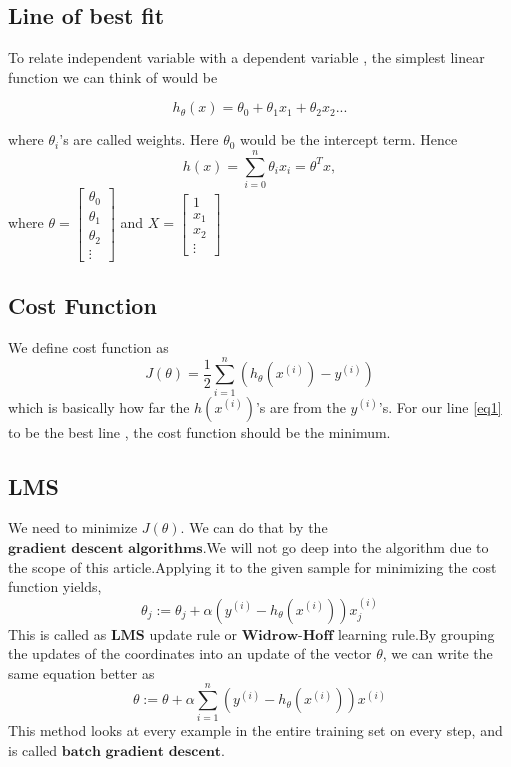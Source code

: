 \documentclass[a4paper,12pt,reqno]{amsart}
\begin{document}
\subsection{Line of best fit}
To relate independent variable with a dependent variable , the simplest linear function we can think of would be 

\begin{equation} \label{eq1}
h_{\theta}(x) = \theta_0 + \theta_{1}x_{1} + \theta_{2}x_{2} ...
\end{equation}

where $\theta_{i}$'s are called weights. Here $\theta_0$ would be the intercept term. Hence
\begin{equation} \label{eq2}
h(x) = \sum_{i=0}^{n} \theta_{i}x_{i} = \theta^{T}x,
\end{equation} 
where $\theta =  
\begin{bmatrix}
\theta_0 \\
\theta_1 \\
\theta_2 \\
\vdots
\end{bmatrix}
$
and 
$
X = 
\begin{bmatrix}
1 \\
x_1 \\
x_2 \\
\vdots
\end{bmatrix}
$
\subsection{Cost Function}
We define cost function as 
\begin{equation} \label{eq3}
J(\theta) = \frac{1}{2}\sum_{i=1}^{n}(h_{\theta}(x^{(i)}) - y^{(i)})
\end{equation}
which is basically how far the $h(x^{(i)})$'s are from the $y^{(i)}$'s.
For our line \ref{eq1} to be the best line , the cost function should be the minimum.
\subsection{LMS}
We need to minimize $J(\theta)$. We can do that by the $\textbf{gradient descent algorithms}$.We will not go deep into the algorithm due to the scope of this article.Applying it to the given sample for minimizing the cost function yields,
\begin{equation} \label{eq4}
\theta_{j} := \theta_{j} + \alpha(y^{(i)}-h_{\theta}(x^{(i)}))x_j^{(i)}
\end{equation}
This is called as $\textbf{LMS}$ update rule or $\textbf{Widrow-Hoff}$ learning rule.By grouping the updates of the coordinates into an update of the vector $\theta$, we can write the same equation better as 
\begin{equation} \label{eq5}
\theta := \theta + \alpha \sum_{i=1}^{n}(y^{(i)} - h_{\theta}(x^{(i)}))x^{(i)}
\end{equation}
This method looks at every example in the entire training set on every step, and is called $\textbf{batch gradient descent}$.
\end{document}
